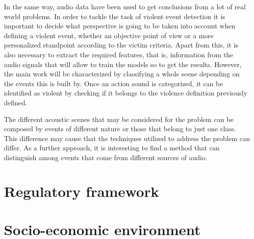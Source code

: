 	In the same way, audio data have been used to get conclusions from a lot of real world problems. In order to tackle the task of violent event detection it is important to decide what perspective is going to be taken into account when defining a violent event, whether an objective point of view or a more personalized standpoint according to the victim criteria. Apart from this, it is also necessary to extract the required features, that is, information from the audio signals that will allow to train the models so to get the results. However, the main work will be characterized by classifying a whole scene depending on the events this is built by. Once an action sound is categorized, it can be identified as violent by checking if it belongs to the violence definition previously defined.
		
	The different acoustic scenes that may be considered for the problem can be composed by events of different nature or those that belong to just one class. This difference may cause that the techniques utilized to address the problem can differ. As a further approach, it is interesting to find a method that can distinguish among events that come from different sources of audio.
	
\section{Regulatory framework}

\section{Socio-economic environment}
	
	
	
	